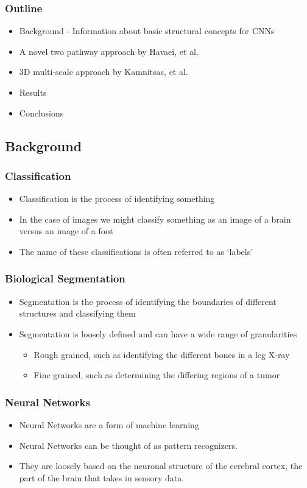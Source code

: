 \documentclass{beamer}
\begin{document}
\begin{frame}
  \frametitle{Outline}
  \tableofcontents[hideallsubsections]
  \begin{itemize}
  	\item Background - Information about basic structural concepts for CNNs
  	\item A novel two pathway approach by Havaei, et al.
  	\item 3D multi-scale approach by Kamnitsas, et al.
  	\item Results
  	\item Conclusions
  \end{itemize}
\end{frame}

\subsection*{Background}

\begin{frame}
  \frametitle{Classification}
  \begin{itemize}
	\item Classification is the process of identifying something
	\item In the case of images we might classify something as an image of a brain versus an image of a foot
	\item The name of these classifications is often referred to as `labels'
  \end{itemize}
\end{frame}

\begin{frame}
  \frametitle{Biological Segmentation}
  \begin{itemize}
	\item Segmentation is the process of identifying the boundaries of different structures and classifying them
	\item Segmentation is loosely defined and can have a wide range of granularities
	\begin{itemize}
	  \item Rough grained, such as identifying the different bones in a leg X-ray
	  \item Fine grained, such as determining the differing regions of a tumor
	\end{itemize}
  \end{itemize}
\end{frame}

\begin{frame}
  \frametitle{Neural Networks}
  \begin{itemize}
	\item Neural Networks are a form of machine learning
	\item Neural Networks can be thought of as pattern recognizers.
	\item They are loosely based on the neuronal structure of the cerebral cortex, the part of the brain that takes in sensory data.
  \end{itemize}
\end{frame}
\end{document}
